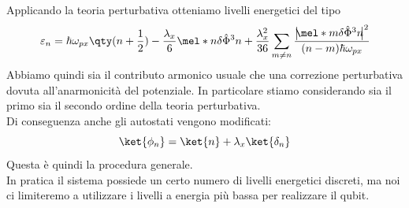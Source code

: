 Applicando la teoria perturbativa otteniamo livelli energetici del tipo
\begin{equation*}
    \varepsilon_n
    =
    \hbar\omega_{px}
    \qty(
        n+\frac{1}{2}
    )
    -
    \frac{\lambda_x}{6}
    \mel*{n}{\delta\hat{\Phi}^3}{n}
    +
    \frac{\lambda_x^2}{36}
    \sum_{m\neq n}
    \frac{ \bigl| \hspace{-0.1cm} \mel*{m}{\delta\hat{\Phi}^3}{n} \hspace{-0.1cm} \bigr|^2}{(n-m)\hbar\omega_{px}}
\end{equation*}
Abbiamo quindi sia il contributo armonico usuale che una correzione perturbativa dovuta all'anarmonicità del potenziale. In particolare stiamo considerando sia il primo sia il secondo ordine della teoria perturbativa.\\
Di conseguenza anche gli autostati vengono modificati:
\begin{equation*}
    \ket{\phi_n}
    =
    \ket{n}
    +
    \lambda_x\ket{\delta_n}
\end{equation*}
Questa è quindi la procedura generale.\\
In pratica il sistema possiede un certo numero di livelli energetici discreti, ma noi ci limiteremo a utilizzare i livelli a energia più bassa per realizzare il qubit.
